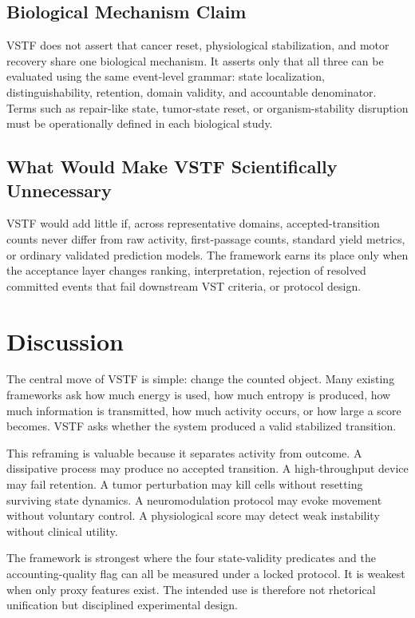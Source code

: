 \documentclass[11pt,a4paper]{article}
\newcommand{\1}{\mathbf{1}}
\begin{document}
\subsection{Biological Mechanism Claim}

VSTF does not assert that cancer reset, physiological stabilization, and motor recovery share one biological mechanism. It asserts only that all three can be evaluated using the same event-level grammar: state localization, distinguishability, retention, domain validity, and accountable denominator. Terms such as repair-like state, tumor-state reset, or organism-stability disruption must be operationally defined in each biological study.

\subsection{What Would Make VSTF Scientifically Unnecessary}

VSTF would add little if, across representative domains, accepted-transition counts never differ from raw activity, first-passage counts, standard yield metrics, or ordinary validated prediction models. The framework earns its place only when the acceptance layer changes ranking, interpretation, rejection of resolved committed events that fail downstream VST criteria, or protocol design.

\section{Discussion}

The central move of VSTF is simple: change the counted object. Many existing frameworks ask how much energy is used, how much entropy is produced, how much information is transmitted, how much activity occurs, or how large a score becomes. VSTF asks whether the system produced a valid stabilized transition.

This reframing is valuable because it separates activity from outcome. A dissipative process may produce no accepted transition. A high-throughput device may fail retention. A tumor perturbation may kill cells without resetting surviving state dynamics. A neuromodulation protocol may evoke movement without voluntary control. A physiological score may detect weak instability without clinical utility.

The framework is strongest where the four state-validity predicates and the accounting-quality flag can all be measured under a locked protocol. It is weakest when only proxy features exist. The intended use is therefore not rhetorical unification but disciplined experimental design.
\end{document}
